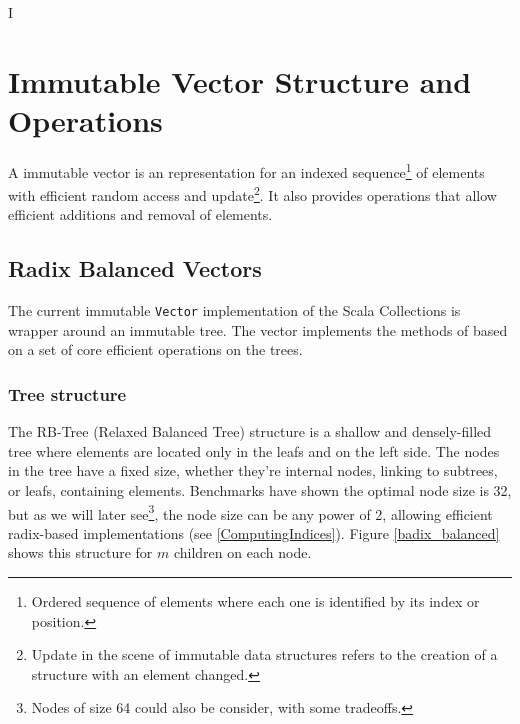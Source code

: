 I%

\chapter{Immutable Vector Structure and Operations} %

\label{VectorStructure} %



 A immutable vector is an representation for an indexed sequence\footnote{Ordered sequence of elements where each one is identified by its index or position.} of elements with efficient random access and update\footnote{Update in the scene of immutable data structures refers to the creation of a structure with an element changed.}. It also provides operations that allow efficient additions and removal of elements.
 
\section{Radix Balanced Vectors}
\label{RadixBalancedVectors}
The current immutable \texttt{Vector} implementation\cite{scalaVector211} of the Scala Collections is wrapper around an immutable tree. The vector implements the methods of based on a set of core efficient operations on the trees.


\subsection{Tree structure}
\label{RRBTreeStructure}
The RB-Tree (Relaxed Balanced Tree)  structure is a shallow and densely-filled tree where elements are located only in the leafs and on the left side. The nodes in the tree have a fixed size, whether they're internal nodes, linking to subtrees, or leafs, containing elements. Benchmarks have shown the optimal node size is 32, but as we will later see\footnote{Nodes of size 64 could also be consider, with some tradeoffs.}, the node size can be any power of 2, allowing efficient radix-based implementations (see \ref{ComputingIndices}). Figure \ref{badix_balanced} shows this structure for $m$ children on each node. 

